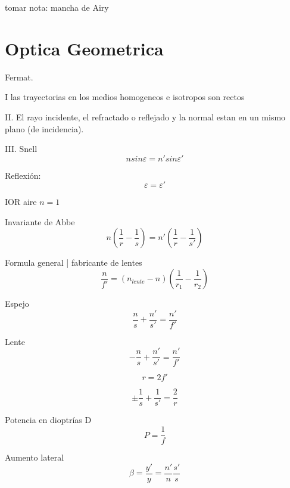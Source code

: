 \documentclass[12pt, letterpaper, twoside]{article}
\begin{document}
	tomar nota: mancha de Airy
	
	\section{Optica Geometrica}
	
	Fermat.
	
	I las trayectorias en los medios homogeneos e isotropos son rectos
	
	II. El rayo incidente, el refractado o reflejado y la normal estan en un mismo plano (de incidencia).
	
	III. Snell
	\begin{equation}
		n sin \varepsilon = n' sin \varepsilon'
	\end{equation}

	Reflexión: 
	\begin{equation}
		\varepsilon = \varepsilon'
	\end{equation}
	
	IOR aire $n = 1$

	Invariante de Abbe
	\begin{equation}
		n ( \frac{1}{r} - \frac{1}{s} ) = n' (\frac{1}{r} - \frac{1}{s'} )
	\end{equation}

	Formula general | fabricante de lentes	
	\begin{equation}
		\frac{n}{f'} = (n_{lente} - n)(\frac{1}{r_1} - \frac{1}{r_2})
	\end{equation}

	Espejo
	\begin{equation}
		\frac{n}{s} + \frac{n'}{s'} = \frac{n'}{f'}
	\end{equation}

	Lente
	\begin{equation}
		-\frac{n}{s} + \frac{n'}{s'} = \frac{n'}{f'}
	\end{equation}

	\begin{equation}
		r = 2f'
	\end{equation}

	\begin{equation}
		\pm \frac{1}{s} + \frac{1}{s'} = \frac{2}{r}
	\end{equation}
	
	Potencia en dioptrías D
	\begin{equation}
		P = \frac{1}{f}
	\end{equation}
	
	Aumento lateral
	\begin{equation}
		\beta = \frac{y'}{y} = \frac{n'}{n} \frac{s'}{s}
	\end{equation}
\end{document}
